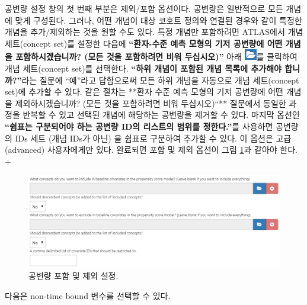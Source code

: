 \documentclass[11pt]{book}
\theoremstyle{definition}
\theoremstyle{definition}
\theoremstyle{definition}
\theoremstyle{remark}
\begin{document}
공변량 설정 창의 첫 번째 부분은 제외/포함 옵션이다. 공변량은 일반적으로
모든 개념에 맞게 구성된다. 그러나, 어떤 개념이 대상 코호트 정의와 연결된
경우와 같이 특정한 개념을 추가/제외하는 것을 원할 수도 있다. 특정 개념만
포함하려면 ATLAS에서 개념 세트(concept set)를 설정한 다음에
\textbf{``환자-수준 예측 모형의 기저 공변량에 어떤 개념을
포함하시겠습니까? (모든 것을 포함하려면 비워 두십시오)''} 아래
\includegraphics{images/PopulationLevelEstimation/open.png}를 클릭하여
개념 세트(concept set)를 선택한다. \textbf{``하위 개념이 포함된 개념
목록에 추가해야 합니까?''}라는 질문에 ``예''라고 답함으로써 모든 하위
개념을 자동으로 개념 세트(concept set)에 추가할 수 있다. 같은 절차는
**환자 수준 예측 모형의 기저 공변량에 어떤 개념을 제외하시겠습니까?
(모든 것을 포함하려면 비워 두십시오)``** 질문에서 동일한 과정을 반복할
수 있고 선택된 개념에 해당하는 공변량을 제거할 수 있다. 마지막 옵션인
\textbf{``쉼표는 구분되어야 하는 공변량 ID의 리스트의 범위를
정한다.''}를 사용하면 공변량의 IDs 세트 (개념 IDs가 아닌) 을 쉼표로
구분하여 추가할 수 있다. 이 옵션은 고급(advanced) 사용자에게만 있다.
완료되면 포함 및 제외 옵션이 그림 \ref{fig:covariateSettings1}과 같아야
한다. +

\begin{figure}

{\centering \includegraphics[width=1\linewidth]{images/PatientLevelPrediction/covariateSettings1} 

}

\caption{공변량 포함 및 제외 설정.}\label{fig:covariateSettings1}
\end{figure}

다음은 non-time bound 변수를 선택할 수 있다.
\end{document}
